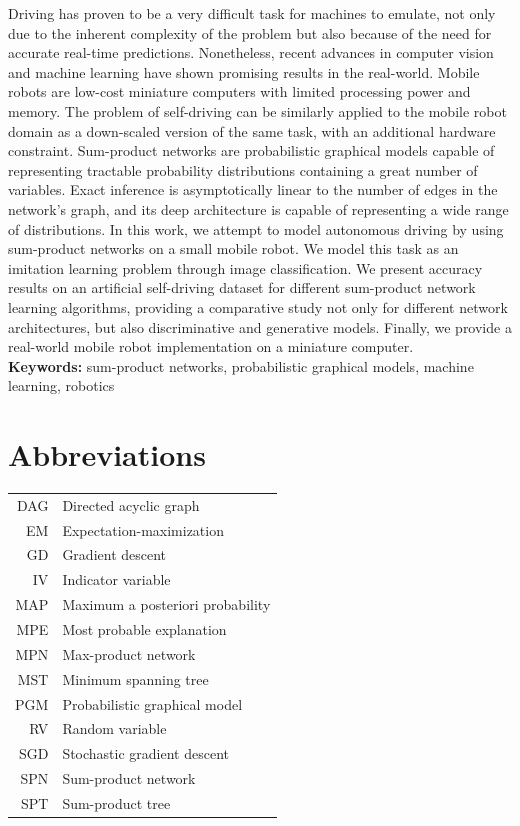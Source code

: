 Driving has proven to be a very difficult task for machines to emulate, not only due to the
inherent complexity of the problem but also because of the need for accurate real-time predictions.
Nonetheless, recent advances in computer vision and machine learning have shown promising results
in the real-world. Mobile robots are low-cost miniature computers with limited processing power and
memory. The problem of self-driving can be similarly applied to the mobile robot domain as a
down-scaled version of the same task, with an additional hardware constraint. Sum-product networks
are probabilistic graphical models capable of representing tractable probability distributions
containing a great number of variables.  Exact inference is asymptotically linear to the number of
edges in the network's graph, and its deep architecture is capable of representing a wide range of
distributions. In this work, we attempt to model autonomous driving by using sum-product networks
on a small mobile robot. We model this task as an imitation learning problem through image
classification. We present accuracy results on an artificial self-driving dataset for different
sum-product network learning algorithms, providing a comparative study not only for different
network architectures, but also discriminative and generative models. Finally, we provide a
real-world mobile robot implementation on a miniature computer.\\

\noindent\textbf{Keywords:} sum-product networks, probabilistic graphical models, machine learning,
robotics

\chapter*{Abbreviations}
\begin{tabular}{rl}
  DAG & Directed acyclic graph\\
  EM & Expectation-maximization\\
  GD & Gradient descent\\
  IV & Indicator variable\\
  MAP & Maximum a posteriori probability\\
  MPE & Most probable explanation\\
  MPN & Max-product network\\
  MST & Minimum spanning tree\\
  PGM & Probabilistic graphical model\\
  RV & Random variable\\
  SGD & Stochastic gradient descent\\
  SPN & Sum-product network\\
  SPT & Sum-product tree\\
\end{tabular}

